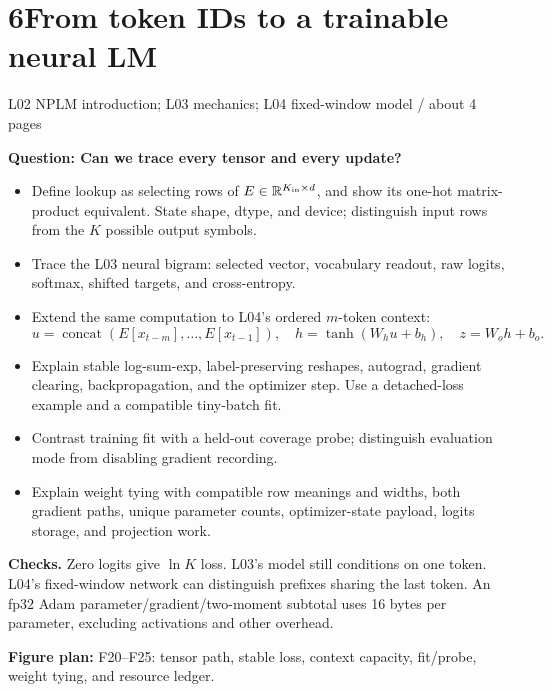 \documentclass[11pt,a4paper]{article}
\newcommand{\sectionplan}[3]{%
  \section{\texorpdfstring{#1\quad #2}{#1 #2}}
  {\small\color{muted}#3\par}}
\newcommand{\tagline}[1]{\textcolor{courseblue}{\textbf{#1}}}
\newcommand{\figids}[1]{\textcolor{courseteal}{\textbf{Figure plan:} #1}}
\newcommand{\R}{\mathbb{R}}
\begin{document}
\sectionplan{6}{From token IDs to a trainable neural LM}{L02 NPLM introduction; L03 mechanics; L04 fixed-window model \quad / \quad about 4 pages}
\tagline{Question: Can we trace every tensor and every update?}
\begin{itemize}
  \item Define lookup as selecting rows of $E\in\R^{K_{\rm in}\times d}$,
  and show its one-hot matrix-product equivalent. State shape, dtype, and
  device; distinguish input rows from the $K$ possible output symbols.
  \item Trace the L03 neural bigram: selected vector, vocabulary readout,
  raw logits, softmax, shifted targets, and cross-entropy.
  \item Extend the same computation to L04's ordered $m$-token context:
  \[
  u=\operatorname{concat}(E[x_{t-m}],\ldots,E[x_{t-1}]),\quad
  h=\tanh(W_hu+b_h),\quad z=W_oh+b_o .
  \]
  \item Explain stable log-sum-exp, label-preserving reshapes, autograd,
  gradient clearing, backpropagation, and the optimizer step.
  Use a detached-loss example and a compatible tiny-batch fit.
  \item Contrast training fit with a held-out coverage probe; distinguish
  evaluation mode from disabling gradient recording.
  \item Explain weight tying with compatible row meanings and widths,
  both gradient paths, unique parameter
  counts, optimizer-state payload, logits storage, and projection work.
\end{itemize}
\textbf{Checks.} Zero logits give $\ln K$ loss. L03's model still conditions
on one token. L04's fixed-window network can distinguish prefixes sharing
the last token. An fp32 Adam parameter/gradient/two-moment subtotal uses
16 bytes per parameter, excluding activations and other overhead.

\figids{F20--F25: tensor path, stable loss, context capacity, fit/probe,
weight tying, and resource ledger.}
\end{document}
